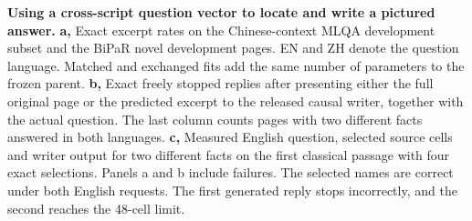 \textbf{Using a cross-script question vector to locate and write a pictured answer.}
\textbf{a,} Exact excerpt rates on the Chinese-context MLQA development subset and the BiPaR novel development pages. EN and ZH denote the question language. Matched and exchanged fits add the same number of parameters to the frozen parent.
\textbf{b,} Exact freely stopped replies after presenting either the full original page or the predicted excerpt to the released causal writer, together with the actual question. The last column counts pages with two different facts answered in both languages.
\textbf{c,} Measured English question, selected source cells and writer output for two different facts on the first classical passage with four exact selections. Panels a and b include failures.
The selected names are correct under both English requests. The first generated reply stops incorrectly, and the second reaches the 48-cell limit.
